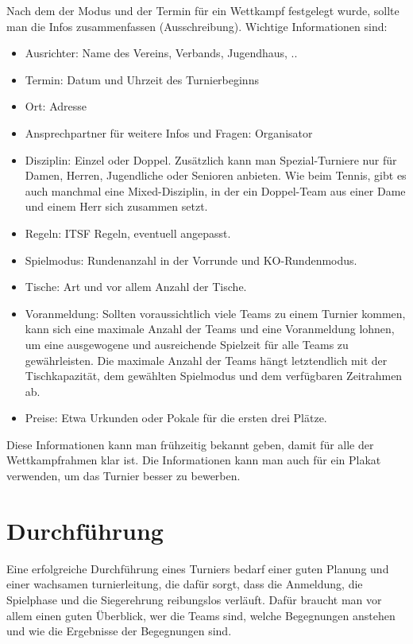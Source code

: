 Nach dem der Modus und der Termin für ein Wettkampf festgelegt wurde, sollte man die Infos zusammenfassen (Ausschreibung). Wichtige Informationen sind:
\begin{itemize}
\item Ausrichter: Name des Vereins, Verbands, Jugendhaus, ..
\item Termin: Datum und Uhrzeit des Turnierbeginns
\item Ort: Adresse
\item Ansprechpartner für weitere Infos und Fragen: Organisator
\item Disziplin: Einzel oder Doppel. Zusätzlich kann man Spezial-Turniere nur für Damen, Herren, Jugendliche oder Senioren anbieten. Wie beim Tennis, gibt es auch manchmal eine Mixed-Disziplin, in der ein Doppel-Team aus einer Dame und einem Herr sich zusammen setzt.   
\item Regeln: ITSF Regeln, eventuell angepasst.
\item Spielmodus: Rundenanzahl in der Vorrunde und KO-Rundenmodus.
\item Tische: Art und vor allem Anzahl der Tische. 
\item Voranmeldung: Sollten voraussichtlich viele Teams zu einem Turnier kommen, kann sich eine maximale Anzahl der Teams und eine Voranmeldung lohnen, um eine ausgewogene und ausreichende Spielzeit für alle Teams zu gewährleisten. 
Die maximale Anzahl der Teams hängt letztendlich mit der Tischkapazität, dem gewählten Spielmodus und dem verfügbaren Zeitrahmen ab.  
\item Preise: Etwa Urkunden oder Pokale für die ersten drei Plätze.
\end{itemize}
Diese Informationen kann man frühzeitig bekannt geben, damit für alle der Wettkampfrahmen klar ist.
Die Informationen kann man auch für ein Plakat verwenden, um das Turnier besser zu bewerben. 


\section{Durchführung}
\label{turniere:durchfuehrung}

Eine erfolgreiche Durchführung eines Turniers bedarf einer guten Planung und einer wachsamen \gls{turnierleitung}, die dafür sorgt, dass die Anmeldung, die Spielphase und die Siegerehrung reibungslos verläuft. 
Dafür braucht man vor allem einen guten Überblick, wer die Teams sind, welche Begegnungen anstehen und wie die Ergebnisse der Begegnungen sind. 

